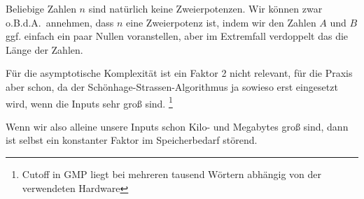 \begin{remark}
    Beliebige Zahlen $n$ sind natürlich keine Zweierpotenzen. Wir können zwar o.B.d.A.\ annehmen, dass $n$ eine Zweierpotenz ist, indem wir den Zahlen $A$ und $B$ ggf. einfach ein paar Nullen voranstellen, aber im Extremfall verdoppelt das die Länge der Zahlen.

    Für die asymptotische Komplexität ist ein Faktor 2 nicht relevant, für die Praxis aber schon, da der Schönhage-Strassen-Algorithmus ja sowieso erst eingesetzt wird, wenn die Inputs sehr groß sind. \footnote{Cutoff in GMP liegt bei mehreren tausend Wörtern abhängig von der verwendeten Hardware}

    Wenn wir also alleine unsere Inputs schon Kilo- und Megabytes groß sind, dann ist selbst ein konstanter Faktor im Speicherbedarf störend.
\end{remark}